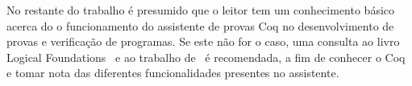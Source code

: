     No restante do trabalho é presumido que o leitor tem um conhecimento básico acerca do o funcionamento do assistente de provas Coq no desenvolvimento de provas e verificação de programas. Se este não for o caso, uma consulta ao livro Logical Foundations~\cite{Pierce2017Logical} e ao trabalho de~ é recomendada, a fim de conhecer o Coq e tomar nota das diferentes funcionalidades presentes no assistente.
